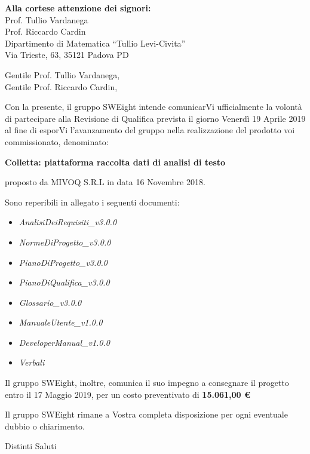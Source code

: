 \documentclass[11pt]{brownletter}
\date{Padova, 12 Aprile 2019} %
\newcommand{\AdR}{\emph{AnalisiDeiRequisiti\_v3.0.0}}
\newcommand{\NdP}{\emph{NormeDiProgetto\_v3.0.0}}
\newcommand{\PdP}{\emph{PianoDiProgetto\_v3.0.0}}
\newcommand{\PdQ}{\emph{PianoDiQualifica\_v3.0.0}}
\newcommand{\G}{\emph{Glossario\_v3.0.0}}
\newcommand{\MU}{\emph{ManualeUtente\_v1.0.0}}
\newcommand{\MS}{\emph{DeveloperManual\_v1.0.0}}
\begin{document}
\begin{letter}{\textbf{Alla cortese attenzione dei signori:}\\
	Prof. Tullio Vardanega\\
	Prof. Riccardo Cardin\\
	Dipartimento di Matematica “Tullio Levi-Civita”\\
	Via Trieste, 63, 35121 Padova PD}

\opening{	Gentile Prof. Tullio Vardanega,\\
			Gentile Prof. Riccardo Cardin,\\}

Con la presente, il gruppo SWEight intende comunicarVi ufficialmente la volontà di partecipare  alla Revisione di Qualifica prevista il giorno Venerdì 19 Aprile 2019 al fine di esporVi l’avanzamento del gruppo nella realizzazione del prodotto voi commissionato, denominato:
\begin{center}
	\textbf{Colletta: piattaforma raccolta dati di analisi di testo}
\end{center}
proposto da MIVOQ S.R.L in data 16 Novembre 2018.

Sono reperibili in allegato i seguenti documenti:
\begin{itemize}
	\item \AdR
	\item \NdP
	\item \PdP
	\item \PdQ
	\item \G
	\item \MU
	\item \MS
	\item \emph{Verbali}
\end{itemize}
Il gruppo SWEight, inoltre, comunica il suo impegno a consegnare il progetto entro il 17 Maggio 2019, per un costo preventivato di \textbf{15.061,00 \euro}

Il gruppo SWEight rimane a Vostra completa disposizione per ogni eventuale dubbio o chiarimento.
\closing{Distinti Saluti}

\end{letter}
\end{document}
